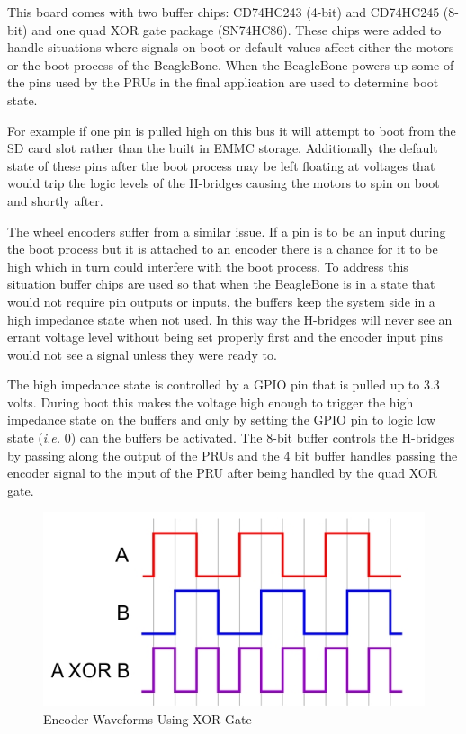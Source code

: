 \documentclass[12pt,oneside,final]{siuethesis}
\theoremstyle{definition}
\begin{document}
This board comes with two buffer chips: CD74HC243 (4-bit) and CD74HC245 (8-bit) and one quad XOR gate package (SN74HC86). These chips were added to handle situations where signals on boot or default values affect either the motors or the boot process of the BeagleBone. When the BeagleBone powers up some of the pins used by the PRUs in the final application are used to determine boot state. 

For example if one pin is pulled high on this bus it will attempt to boot from the SD card slot rather than the built in EMMC storage. Additionally the default state of these pins after the boot process may be left floating at voltages that would trip the logic levels of the H-bridges causing the motors to spin on boot and shortly after. 

The wheel encoders suffer from a similar issue. If a pin is to be an input during the boot process but it is attached to an encoder there is a chance for it to be high which in turn could interfere with the boot process. To address this situation buffer chips are used so that when the BeagleBone is in a state that would not require pin outputs or inputs, the buffers keep the system side in a high impedance state when not used.  In this way the H-bridges will never see an errant voltage level without being set properly first and the encoder input pins would not see a signal unless they were ready to. 

The high impedance state is controlled by a GPIO pin that is pulled up to 3.3 volts. During boot this makes the voltage high enough to trigger the high impedance state on the buffers and only by setting the GPIO pin to logic low state (\emph{i.e.} 0) can the buffers be activated. The 8-bit buffer controls the H-bridges by passing along the output of the PRUs and the 4 bit buffer handles passing the encoder signal to the input of the PRU after being handled by the quad XOR gate.

\begin{figure}[htbp!]
 \centering
 \includegraphics[scale=2,keepaspectratio=true]{./images/encoder.jpg}
 \caption{Encoder Waveforms Using XOR Gate}
 \label{fig:Encoder_wave}
\end{figure} 
\end{document}

